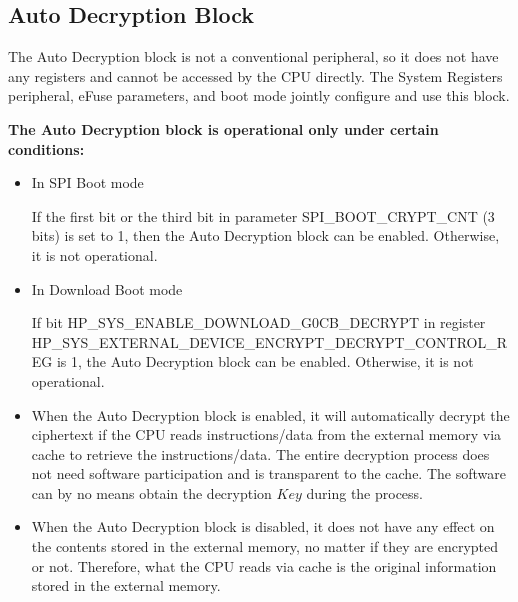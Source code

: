 \documentclass[main\_\_EN.tex]{subfiles}
\begin{document}
\subsection{Auto Decryption Block}

The Auto Decryption block is not a conventional peripheral, so it does not have any registers and cannot be accessed by the CPU directly. The System Registers peripheral, eFuse parameters, and boot mode jointly configure and use this block.

\textbf{The Auto Decryption block is operational only under certain conditions:}

\begin{itemize}

    \item In SPI Boot mode

    If the first bit or the third bit in parameter SPI\_BOOT\_CRYPT\_CNT (3 bits) is set to 1, then the Auto Decryption block can be enabled. Otherwise, it is not operational.

    \item In Download Boot mode

    If bit HP\_SYS\_ENABLE\_DOWNLOAD\_G0CB\_DECRYPT in register\\ HP\_SYS\_EXTERNAL\_DEVICE\_ENCRYPT\_DECRYPT\_CONTROL\_REG is 1, the Auto Decryption block can be enabled. Otherwise, it is not operational.

\end{itemize}

\begin{tiplisting}
\vspace{-2em}
\begin{itemize}

\item When the Auto Decryption block is enabled, it will automatically decrypt the ciphertext if the CPU reads instructions/data from the external memory via cache to retrieve the instructions/data. The entire decryption process does not need software participation and is transparent to the cache. The software can by no means obtain the decryption \begin{math}\mathit{Key}\end{math} during the process.

\item When the Auto Decryption block is disabled, it does not have any effect on the contents stored in the external memory, no matter if they are encrypted or not. Therefore, what the CPU reads via cache is the original information stored in the external memory.

\end{itemize}
\end{tiplisting}
\end{document}
